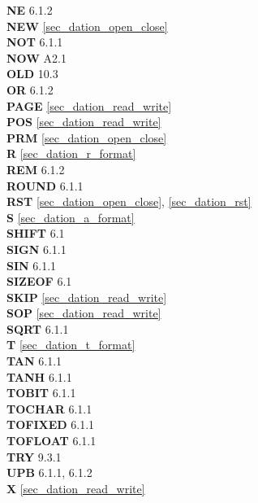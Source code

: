 {{\bf NE} 6.1.2\\
{\bf NEW} \ref{sec_dation_open_close}\\
{\bf NOT} 6.1.1\\
{\bf NOW} A2.1\\
 
{\bf OLD} 10.3\\
{\bf OR} 6.1.2\\
 
{\bf PAGE} \ref{sec_dation_read_write}\\
{\bf POS} \ref{sec_dation_read_write}\\
{\bf PRM} \ref{sec_dation_open_close}\\
 
{\bf R} \ref{sec_dation_r_format}\\
{\bf REM} 6.1.2\\
{\bf ROUND} 6.1.1\\
{\bf RST} \ref{sec_dation_open_close}, \ref{sec_dation_rst} \\
 
{\bf S} \ref{sec_dation_a_format}\\
{\bf SHIFT} 6.1\\
{\bf SIGN} 6.1.1\\
{\bf SIN} 6.1.1\\
{\bf SIZEOF} 6.1\\
{\bf SKIP} \ref{sec_dation_read_write} \\
{\bf SOP}  \ref{sec_dation_read_write}\\
{\bf SQRT} 6.1.1\\
 
{\bf T} \ref{sec_dation_t_format}\\
{\bf TAN} 6.1.1\\
{\bf TANH} 6.1.1\\
{\bf TOBIT} 6.1.1\\
{\bf TOCHAR} 6.1.1\\
{\bf TOFIXED} 6.1.1\\
{\bf TOFLOAT} 6.1.1\\
{\bf TRY} 9.3.1\\
 
{\bf UPB} 6.1.1, 6.1.2\\

{\bf X} \ref{sec_dation_read_write}
}

%
%


\printindex
